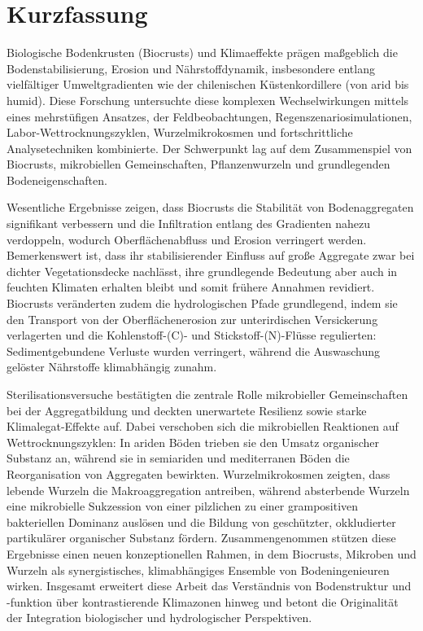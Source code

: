 \chapter*{Kurzfassung}

Biologische Bodenkrusten (Biocrusts) und Klimaeffekte pr\"agen ma{\ss}geblich die Bodenstabilisierung, Erosion und N\"ahrstoffdynamik, insbesondere entlang vielf\"altiger Umweltgradienten wie der chilenischen K\"ustenkordillere (von arid bis humid). Diese Forschung untersuchte diese komplexen Wechselwirkungen mittels eines mehrst\"ufigen Ansatzes, der Feldbeobachtungen, Regenszenariosimulationen, Labor-Wettrocknungszyklen, Wurzelmikrokosmen und fortschrittliche Analysetechniken kombinierte. Der Schwerpunkt lag auf dem Zusammenspiel von Biocrusts, mikrobiellen Gemeinschaften, Pflanzenwurzeln und grundlegenden Bodeneigenschaften.

Wesentliche Ergebnisse zeigen, dass Biocrusts die Stabilit\"at von Bodenaggregaten signifikant verbessern und die Infiltration entlang des Gradienten nahezu verdoppeln, wodurch Oberfl\"achenabfluss und Erosion verringert werden. Bemerkenswert ist, dass ihr stabilisierender Einfluss auf gro{\ss}e Aggregate zwar bei dichter Vegetationsdecke nachl\"asst, ihre grundlegende Bedeutung aber auch in feuchten Klimaten erhalten bleibt und somit fr\"uhere Annahmen revidiert. Biocrusts ver\"anderten zudem die hydrologischen Pfade grundlegend, indem sie den Transport von der Oberfl\"achenerosion zur unterirdischen Versickerung verlagerten und die Kohlenstoff-(C)- und Stickstoff-(N)-Fl\"usse regulierten: Sedimentgebundene Verluste wurden verringert, w\"ahrend die Auswaschung gel\"oster N\"ahrstoffe klimabh\"angig zunahm.

Sterilisationsversuche best\"atigten die zentrale Rolle mikrobieller Gemeinschaften bei der Aggregatbildung und deckten unerwartete Resilienz sowie starke Klimalegat-Effekte auf. Dabei verschoben sich die mikrobiellen Reaktionen auf Wettrocknungszyklen: In ariden B\"oden trieben sie den Umsatz organischer Substanz an, w\"ahrend sie in semiariden und mediterranen B\"oden die Reorganisation von Aggregaten bewirkten. Wurzelmikrokosmen zeigten, dass lebende Wurzeln die Makroaggregation antreiben, w\"ahrend absterbende Wurzeln eine mikrobielle Sukzession von einer pilzlichen zu einer grampositiven bakteriellen Dominanz ausl\"osen und die Bildung von gesch\"utzter, okkludierter partikul\"arer organischer Substanz f\"ordern. Zusammengenommen st\"utzen diese Ergebnisse einen neuen konzeptionellen Rahmen, in dem Biocrusts, Mikroben und Wurzeln als synergistisches, klimabh\"angiges Ensemble von Bodeningenieuren wirken. Insgesamt erweitert diese Arbeit das Verst\"andnis von Bodenstruktur und -funktion \"uber kontrastierende Klimazonen hinweg und betont die Originalit\"at der Integration biologischer und hydrologischer Perspektiven.